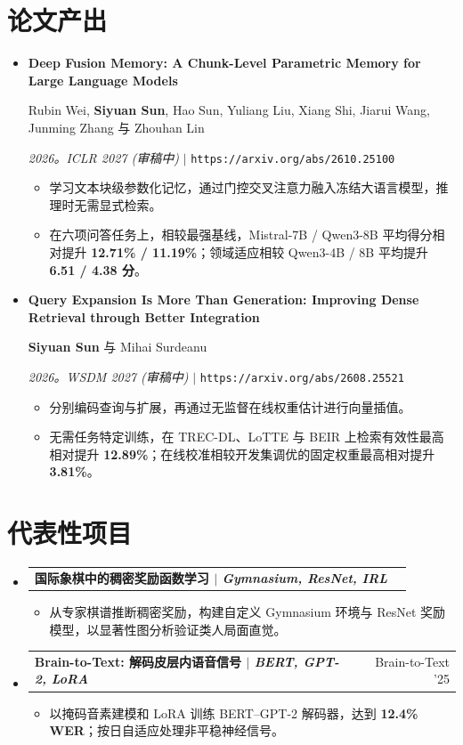\documentclass[letterpaper,11pt]{article}
\makeatletter
\newcommand{\resumeItem}[1]{
  \item\small{
    {#1 \vspace{-2pt}}
  }
}
\newcommand{\resumeProjectHeading}[2]{
    \item
    \begin{tabular*}{0.97\textwidth}{l@{\extracolsep{\fill}}r}
      \textbf{\small#1} & #2 \\
    \end{tabular*}\vspace{-7pt}
}
\newcommand{\resumePublication}[4]{
    \item
    {\small\textbf{#1}\par}
    {\small #2\par}
    {\small\textit{#3} $|$ \nolinkurl{#4}\par}\vspace{-7pt}
}
\newcommand{\resumeSubHeadingListStart}{\begin{itemize}[leftmargin=0.15in, label={}]}
\newcommand{\resumeSubHeadingListEnd}{\end{itemize}}
\newcommand{\resumeItemListStart}{\begin{itemize}[leftmargin=0.2in]}
\newcommand{\resumeItemListEnd}{\end{itemize}\vspace{-5pt}}
\makeatother
\begin{document}
\section{论文产出}
    \resumeSubHeadingListStart
      \resumePublication
          {Deep Fusion Memory: A Chunk-Level Parametric Memory for Large Language Models}
          {Rubin Wei, \textbf{Siyuan Sun}, Hao Sun, Yuliang Liu, Xiang Shi, Jiarui Wang, Junming Zhang 与 Zhouhan Lin}
          {2026。ICLR 2027 (审稿中)}{https://arxiv.org/abs/2610.25100}
          \resumeItemListStart
            \resumeItem{学习文本块级参数化记忆，通过门控交叉注意力融入冻结大语言模型，推理时无需显式检索。}
            \resumeItem{在六项问答任务上，相较最强基线，Mistral-7B / Qwen3-8B 平均得分相对提升 \textbf{12.71\% / 11.19\%}；领域适应相较 Qwen3-4B / 8B 平均提升 \textbf{6.51 / 4.38 分}。}
          \resumeItemListEnd

      \resumePublication
          {Query Expansion Is More Than Generation: Improving Dense Retrieval through Better Integration}
          {\textbf{Siyuan Sun} 与 Mihai Surdeanu}
          {2026。WSDM 2027 (审稿中)}{https://arxiv.org/abs/2608.25521}
          \resumeItemListStart
            \resumeItem{分别编码查询与扩展，再通过无监督在线权重估计进行向量插值。}
            \resumeItem{无需任务特定训练，在 TREC-DL、LoTTE 与 BEIR 上检索有效性最高相对提升 \textbf{12.89\%}；在线校准相较开发集调优的固定权重最高相对提升 \textbf{3.81\%}。}
          \resumeItemListEnd

    \resumeSubHeadingListEnd

\section{代表性项目}
    \resumeSubHeadingListStart
      \resumeProjectHeading
          {国际象棋中的稠密奖励函数学习 $|$ \emph{Gymnasium, ResNet, IRL}}{}
          \resumeItemListStart
            \resumeItem{从专家棋谱推断稠密奖励，构建自定义 Gymnasium 环境与 ResNet 奖励模型，以显著性图分析验证类人局面直觉。}
          \resumeItemListEnd

      \resumeProjectHeading
          {Brain-to-Text: 解码皮层内语音信号 $|$ \emph{BERT, GPT-2, LoRA}}{Brain-to-Text '25}
          \resumeItemListStart
            \resumeItem{以掩码音素建模和 LoRA 训练 BERT--GPT-2 解码器，达到 \textbf{12.4\% WER}；按日自适应处理非平稳神经信号。}
          \resumeItemListEnd
    \resumeSubHeadingListEnd
\end{document}
